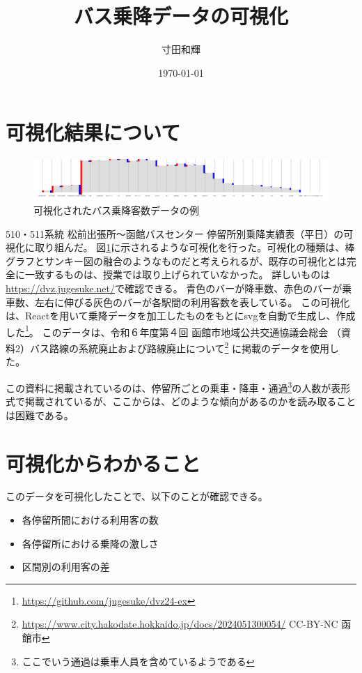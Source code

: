 \documentclass[a4paper,twocolumn,11pt]{ltjsarticle}
\title{バス乗降データの可視化}
\author{寸田和輝}
\date{\today}
\begin{document}
\maketitle

\section{可視化結果について}

\begin{figure}[b]
    \centering
    \includegraphics[width=16cm]{visualize.png}
    \caption{可視化されたバス乗降客数データの例}
    \label{fig:dvz}
\end{figure}

510・511系統 松前出張所～函館バスセンター 停留所別乗降実績表（平日）の可視化に取り組んだ。
図\ref{fig:dvz}に示されるような可視化を行った。可視化の種類は、棒グラフとサンキー図の融合のようなものだと考えられるが、既存の可視化とは完全に一致するものは、授業では取り上げられていなかった。
詳しいものは\url{https://dvz.jugesuke.net/}で確認できる。
青色のバーが降車数、赤色のバーが乗車数、左右に伸びる灰色のバーが各駅間の利用客数を表している。
この可視化は、Reactを用いて乗降データを加工したものをもとにsvgを自動で生成し、作成した\footnote{\url{https://github.com/jugesuke/dvz24-ex}}。
このデータは、令和６年度第４回 函館市地域公共交通協議会総会 （資料2）バス路線の系統廃止および路線廃止について\footnote{\url{https://www.city.hakodate.hokkaido.jp/docs/2024051300054/} CC-BY-NC 函館市} に掲載のデータを使用した。

この資料に掲載されているのは、停留所ごとの乗車・降車・通過\footnote{ここでいう通過は乗車人員を含めているようである}の人数が表形式で掲載されているが、ここからは、どのような傾向があるのかを読み取ることは困難である。

\section{可視化からわかること}

このデータを可視化したことで、以下のことが確認できる。

\begin{itemize}
    \item 各停留所間における利用客の数
    \item 各停留所における乗降の激しさ
    \item 区間別の利用客の差
\end{itemize}
\end{document}
